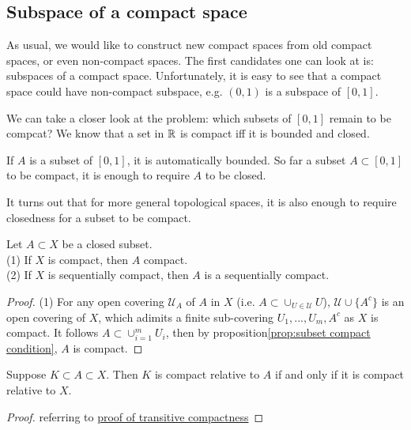 \subsection{Subspace of a compact space}

As usual, we would like to construct new compact spaces from old compact spaces,
or even non-compact spaces. The first candidates one can look at is: subspaces of
a compact space. Unfortunately, it is easy to see that a compact space could have
non-compact subspace, e.g. $(0,1)$ is a subspace of $[0,1]$. 
\par
We can take a closer look at the problem: which subsets of $[0,1]$ remain to be compcat? 
We know that a set in $\mathbb{R}$ is compact iff it is bounded and closed. 
\par
If $A$ is a subset of $[0,1]$, it is automatically bounded. 
So far a subset $A\subset [0,1]$ to be compact, it is enough to require $A$ to be closed.
\par
It turns out that for more general topological spaces, it is also enough to require closedness 
for a subset to be compact. 

\begin{proposition}{}{}
    Let $A\subset X$ be a closed subset.\\
    (1) If $X$ is compact, then $A$ compact.\\
    (2) If $X$ is sequentially compact, then $A$ is a sequentially compact.
\end{proposition}

\begin{proof}
    (1) For any open covering $\mathscr{U}_A$ of $A$ in $X$ (i.e. $A\subset \cup_{U\in\mathscr{U}} U$), 
    $\mathscr{U}\cup \{A^c\}$ is an open covering of $X$, which adimits a finite sub-covering $U_1,...,U_m,A^c$ as $X$ is compact. 
    It follows $A\subset \cup_{i=1}^{m}U_i$, then by proposition\ref{prop:subset compact condition}, 
    $A$ is compact.
\end{proof}

\begin{proposition}{}{}
    Suppose $K\subset A \subset X$. Then $K$ is compact relative to $A$ if and only if 
    it is compact relative to $X$.
\end{proposition}

\begin{proof}
    referring to \href{https://math.iisc.ac.in/~vamsipingali/teaching/um204analysis2017spring/25Jan.pdf}{proof of transitive compactness}
\end{proof}


